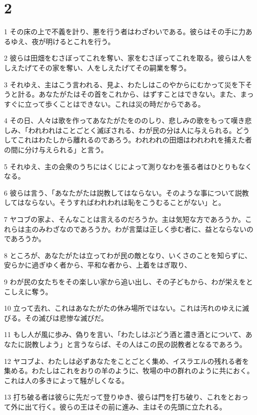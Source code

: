 \chapter{2}

\par 1 その床の上で不義を計り、悪を行う者はわざわいである。彼らはその手に力あるゆえ、夜が明けるとこれを行う。
\par 2 彼らは田畑をむさぼってこれを奪い、家をむさぼってこれを取る。彼らは人をしえたげてその家を奪い、人をしえたげてその嗣業を奪う。
\par 3 それゆえ、主はこう言われる、見よ、わたしはこのやからにむかって災を下そうと計る。あなたがたはその首をこれから、はずすことはできない。また、まっすぐに立って歩くことはできない。これは災の時だからである。
\par 4 その日、人々は歌を作ってあなたがたをののしり、悲しみの歌をもって嘆き悲しみ、「われわれはことごとく滅ぼされる、わが民の分は人に与えられる。どうしてこれはわたしから離れるのであろう。われわれの田畑はわれわれを捕えた者の間に分け与えられる」と言う。
\par 5 それゆえ、主の会衆のうちにはくじによって測りなわを張る者はひとりもなくなる。
\par 6 彼らは言う、「あなたがたは説教してはならない。そのような事について説教してはならない。そうすればわれわれは恥をこうむることがない」と。
\par 7 ヤコブの家よ、そんなことは言えるのだろうか。主は気短な方であろうか。これらは主のみわざなのであろうか。わが言葉は正しく歩む者に、益とならないのであろうか。
\par 8 ところが、あなたがたは立ってわが民の敵となり、いくさのことを知らずに、安らかに過ぎゆく者から、平和な者から、上着をはぎ取り、
\par 9 わが民の女たちをその楽しい家から追い出し、その子どもから、わが栄えをとこしえに奪う。
\par 10 立って去れ、これはあなたがたの休み場所ではない。これは汚れのゆえに滅びる。その滅びは悲惨な滅びだ。
\par 11 もし人が風に歩み、偽りを言い、「わたしはぶどう酒と濃き酒とについて、あなたに説教しよう」と言うならば、その人はこの民の説教者となるであろう。
\par 12 ヤコブよ、わたしは必ずあなたをことごとく集め、イスラエルの残れる者を集める。わたしはこれをおりの羊のように、牧場の中の群れのように共におく。これは人の多きによって騒がしくなる。
\par 13 打ち破る者は彼らに先だって登りゆき、彼らは門を打ち破り、これをとおって外に出て行く。彼らの王はその前に進み、主はその先頭に立たれる。

